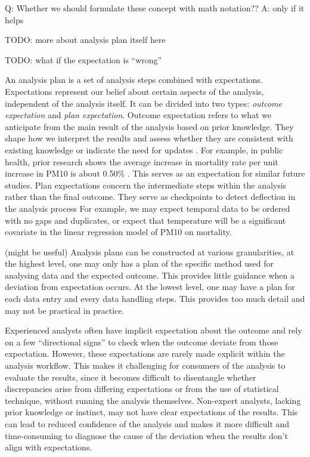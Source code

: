 \documentclass[
]{jds}
\begin{document}
Q: Whether we should formulate these concept with math notation?? A:
only if it helps

TODO: more about analysis plan itself here

TODO: what if the expectation is ``wrong''

An analysis plan is a set of analysis steps combined with expectations.
Expectations represent our belief about certain aspects of the analysis,
independent of the analysis itself. It can be divided into two types:
\emph{outcome expectation} and \emph{plan expectation}. Outcome
expectation refers to what we anticipate from the main result of the
analysis based on prior knowledge. They shape how we interpret the
results and assess whether they are consistent with existing knowledge
or indicate the need for updates \citep{grolemund_cognitive_2014}. For
example, in public health, prior research shows the average increase in
mortality rate per unit increase in PM10 is about 0.50\%
\citep{liu2019ambient}. This serves as an expectation for similar future
studies. Plan expectations concern the intermediate steps within the
analysis rather than the final outcome. They serve as checkpoints to
detect deflection in the analysis process For example, we may expect
temporal data to be ordered with no gaps and duplicates, or expect that
temperature will be a significant covariate in the linear regression
model of PM10 on mortality.

(might be useful) Analysis plans can be constructed at various
granularities, at the highest level, one may only has a plan of the
specific method used for analysing data and the expected outcome. This
provides little guidance when a deviation from expectation occurs. At
the lowest level, one may have a plan for each data entry and every data
handling steps. This provides too much detail and may not be practical
in practice.

Experienced analysts often have implicit expectation about the outcome
and rely on a few ``directional signs'' to check when the outcome
deviate from those expectation. However, these expectations are rarely
made explicit within the analysis workflow. This makes it challenging
for consumers of the analysis to evaluate the results, since it becomes
difficult to disentangle whether discrepancies arise from differing
expectations or from the use of statistical technique, without running
the analysis themselves. Non-expert analysts, lacking prior knowledge or
instinct, may not have clear expectations of the results. This can lead
to reduced confidence of the analysis and makes it more difficult and
time-consuming to diagnose the cause of the deviation when the results
don't align with expectations.
\end{document}
